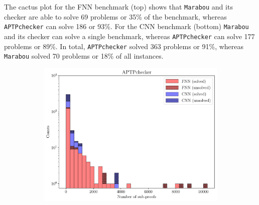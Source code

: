 \documentclass[oneside,11pt,dvipsnames]{book}
\newcommand{\nnproofchecker}{\texttt{APTPchecker}}
\newcommand{\marabou}{\texttt{Marabou}}
\begin{document}
The cactus plot for the FNN benchmark (top)
shows that \marabou{} and its checker are able to solve 69 problems or 35\% of the benchmark, whereas \nnproofchecker{} can solve 186 or 93\%.  
For the CNN benchmark (bottom) \marabou{} and its checker can solve a single benchmark, whereas \nnproofchecker{} can solve 177 problems or 89\%.
In total, \nnproofchecker{} solved 363 problems or 91\%, whereas \marabou{}  solved 70 problems or 18\% of all instances.

\begin{figure}[t]
\begin{subfigure}{0.4\linewidth}
    \centering
    \begin{minipage}[t]{0.75\textwidth}
        \centering  
        \includegraphics[width=\linewidth]{figure/SUB_PROOFS_NONE.pdf}
    \end{minipage}
    \begin{minipage}[t]{0.235\textwidth}
        \centering  

\end{minipage}
\end{subfigure}
\end{figure}
\end{document}
